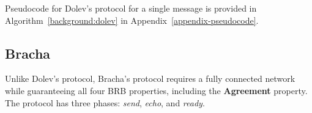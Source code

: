 Pseudocode for Dolev's protocol for a single message is provided in Algorithm~\ref{background:dolev} in Appendix~\ref{appendix-pseudocode}.

  
  

  
            

\subsection*{Bracha}
Unlike Dolev's protocol, Bracha's protocol requires a fully connected network while guaranteeing all four BRB properties, including the \textbf{Agreement} property. 
The protocol has three phases: \textit{send}, \textit{echo}, and \textit{ready}.

